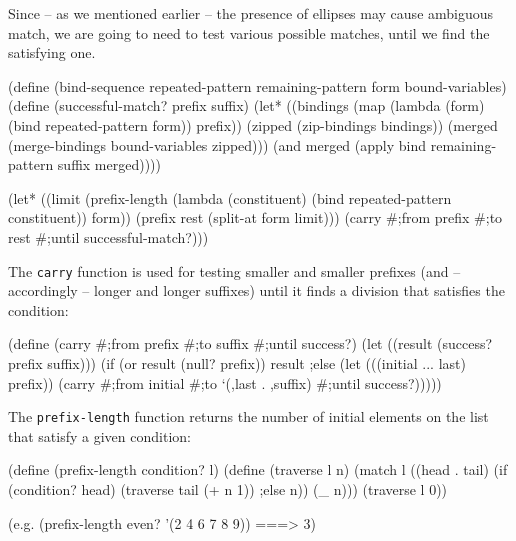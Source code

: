Since -- as we mentioned earlier -- the presence of ellipses may cause
ambiguous match, we are going to need to test various possible matches,
until we find the satisfying one.

\begin{Snippet}
  (define (bind-sequence repeated-pattern remaining-pattern
                         form bound-variables)
    (define (successful-match? prefix suffix)
      (let* ((bindings (map (lambda (form)
                              (bind repeated-pattern form))
                            prefix))
             (zipped (zip-bindings bindings))
             (merged (merge-bindings bound-variables zipped)))
        (and merged (apply bind remaining-pattern suffix
                                merged))))
                            
    (let* ((limit (prefix-length (lambda (constituent)
				   (bind repeated-pattern
				         constituent))
			          form))
	   (prefix rest (split-at form limit)))
      (carry #;from prefix #;to rest
             #;until successful-match?)))
\end{Snippet}

The \texttt{carry} function is used for testing smaller and smaller
prefixes (and -- accordingly -- longer and longer suffixes) until
it finds a division that satisfies the condition:

\begin{Snippet}
  (define (carry #;from prefix #;to suffix #;until success?)
    (let ((result (success? prefix suffix)))
      (if (or result (null? prefix))
	  result
      ;else
	  (let (((initial ... last) prefix))
	    (carry #;from initial #;to `(,last . ,suffix)
			  #;until success?)))))
\end{Snippet}

The \texttt{prefix-length} function returns the number of initial
elements on the list that satisfy a given condition:

\begin{Snippet}
  (define (prefix-length condition? l)
    (define (traverse l n)
      (match l
        ((head . tail)
         (if (condition? head)
	     (traverse tail (+ n 1))
         ;else
             n))
        (_
         n)))
    (traverse l 0))
\end{Snippet}

\begin{Snippet}
  (e.g.
    (prefix-length even? '(2 4 6 7 8 9)) ===> 3)
\end{Snippet}

